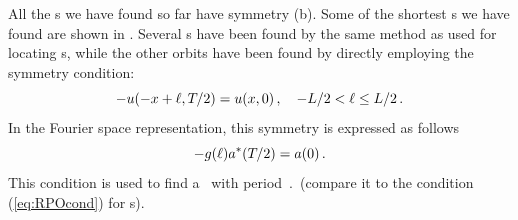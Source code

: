 
All the \po s we have found so far have symmetry (b).
Some of the shortest \po s we have found are shown in
.  Several \po s have been found by the same
method as used for locating \rpo s, while the other orbits have been
found by directly employing the symmetry condition:
\[ -u(-x+\ell,{T_{}}/2) = u(x,0)\,, \quad -L/2 < \ell \leq L/2\,.\]
In the Fourier space representation, this symmetry is expressed as
follows
\[
 -g(\ell)a^\ast({T_{}}/2) = a(0)\,.
\]
This condition is used to find a \po\ with period $\period{}$
(compare it to the condition (\ref{eq:RPOcond}) for \rpo s).


